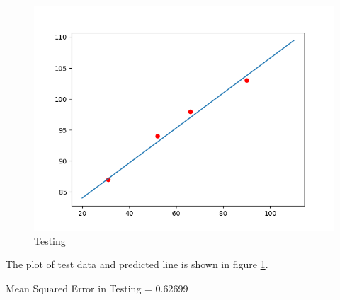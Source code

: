 \documentclass[journal,12pt,twocolumn]{IEEEtran}
\begin{document}
	\begin{figure}[h!]
	  \centering
	   \includegraphics[width=\linewidth]{figs/Test_GD.png}
	   \caption{Testing}
	   \label{fig:Test}
	\end{figure}

	The plot of test data and predicted line is shown in figure \ref{fig:Test}.

	Mean Squared Error in Testing = 0.62699

%	
\end{document}

